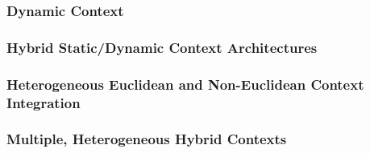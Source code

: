 \subsubsection{Dynamic Context}
\label{subsubsec:adv_dynamic_context}

\subsubsection{Hybrid Static/Dynamic Context Architectures}
\label{subsubsec:adv_hybrid_static_dynamic_context}

\subsubsection{Heterogeneous Euclidean and Non-Euclidean Context Integration}
\label{subsubsec:adv_hybrid_geo_context}

\subsubsection{Multiple, Heterogeneous Hybrid Contexts}
\label{subsubsec:adv_multiple_hybrid_contexts}

